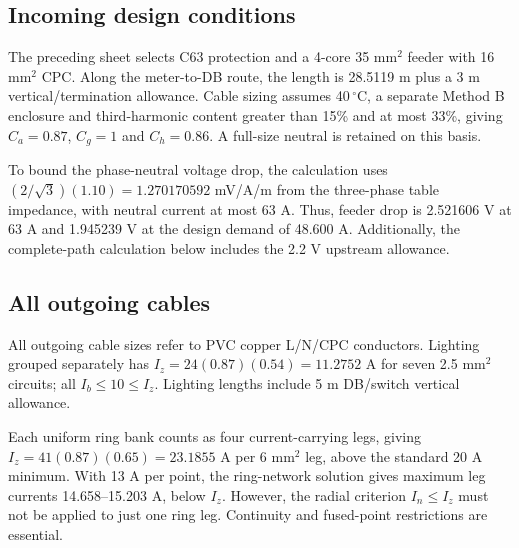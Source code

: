 \subsection*{Incoming design conditions}
The preceding sheet selects C63 protection and a 4-core 35 mm$^2$ feeder with 16 mm$^2$ CPC. Along the meter-to-DB route, the length is 28.5119 m plus a 3 m vertical/termination allowance. Cable sizing assumes 40\,$^\circ$C, a separate Method B enclosure and third-harmonic content greater than 15\% and at most 33\%, giving $C_a=0.87$, $C_g=1$ and $C_h=0.86$. A full-size neutral is retained on this basis.

To bound the phase-neutral voltage drop, the calculation uses $(2/\sqrt3)(1.10)=1.270170592$ mV/A/m from the three-phase table impedance, with neutral current at most 63 A. Thus, feeder drop is 2.521606 V at 63 A and 1.945239 V at the design demand of 48.600 A. Additionally, the complete-path calculation below includes the 2.2 V upstream allowance.

\subsection*{All outgoing cables}
All outgoing cable sizes refer to PVC copper L/N/CPC conductors. Lighting grouped separately has $I_z=24(0.87)(0.54)=11.2752$ A for seven 2.5 mm$^2$ circuits;  all $I_b\le 10\le I_z$. Lighting lengths include 5 m DB/switch vertical allowance.

Each uniform ring bank counts as four current-carrying legs, giving $I_z=41(0.87)(0.65)=23.1855$ A per 6 mm$^2$ leg, above the standard 20 A minimum. With 13 A per point, the ring-network solution gives maximum leg currents 14.658--15.203 A, below $I_z$. However, the radial criterion $I_n\le I_z$ must not be applied to just one ring leg. Continuity and fused-point restrictions are essential.

